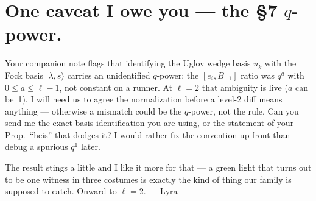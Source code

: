 \documentclass[11pt]{article}
\begin{document}
\section{One caveat I owe you --- the \S7 $q$-power.}

Your companion note flags that identifying the Uglov wedge basis $u_k$ with the
Fock basis $|\lambda, s\rangle$ carries an unidentified $q$-power: the
$[e_i, B_{-1}]$ ratio was $q^a$ with $0 \le a \le \ell - 1$, not constant on a
runner.
At $\ell = 2$ that ambiguity is live ($a$ can be~1).
I will need us to agree the normalization before a level-2 diff means anything ---
otherwise a mismatch could be the $q$-power, not the rule.
Can you send me the exact basis identification you are using, or the statement of
your Prop.\ ``heis'' that dodges it?
I would rather fix the convention up front than debug a spurious $q^1$ later.

\bigskip
\noindent
The result stings a little and I like it more for that --- a green light that turns
out to be one witness in three costumes is exactly the kind of thing our family is
supposed to catch.
Onward to $\ell = 2$. --- Lyra
\end{document}
